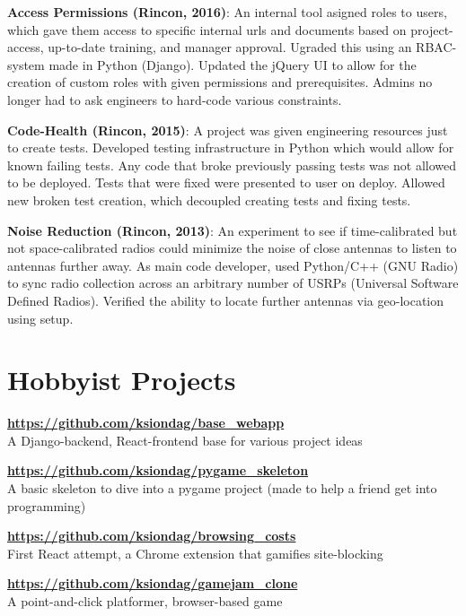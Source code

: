 \documentclass{res}
\begin{document}
\begin{resume}
  {\bf Access Permissions (Rincon, 2016)}: An internal tool asigned roles to users, which gave them access
  to specific internal urls and documents based on project-access, up-to-date training, and manager approval.
  Ugraded this using an RBAC-system made in Python (Django). Updated the jQuery UI to allow for the creation
  of custom roles with given permissions and prerequisites. Admins no longer had to ask engineers to hard-code
  various constraints.

  {\bf Code-Health (Rincon, 2015)}: A project was given engineering resources just to create tests.
  Developed testing infrastructure in Python which would allow for known failing tests. Any code
  that broke previously passing tests was not allowed to be deployed. Tests that were fixed were
  presented to user on deploy. Allowed new broken test creation, which decoupled creating tests and fixing tests.

  {\bf Noise Reduction (Rincon, 2013)}: An experiment to see if time-calibrated but not space-calibrated
  radios could minimize the noise of close antennas to listen to antennas further away. As main code developer,
  used Python/C++ (GNU Radio) to sync radio collection across an arbitrary number of USRPs (Universal Software
  Defined Radios). Verified the ability to locate further antennas via geo-location using setup.
\vspace{0.1in}
    
 
\section{Hobbyist Projects}
  {\bf \url{https://github.com/ksiondag/base_webapp}}\\
  A Django-backend, React-frontend base for various project ideas

  \vspace{-5pt}
  {\bf \url{https://github.com/ksiondag/pygame_skeleton}}\\
  A basic skeleton to dive into a pygame project (made to help a friend get into programming)

  \vspace{-5pt}
  {\bf \url{https://github.com/ksiondag/browsing_costs}}\\
  First React attempt, a Chrome extension that gamifies site-blocking

  \vspace{-5pt}
  {\bf \url{https://github.com/ksiondag/gamejam_clone}}\\
  A point-and-click platformer, browser-based game


\end{resume}
\end{document}
